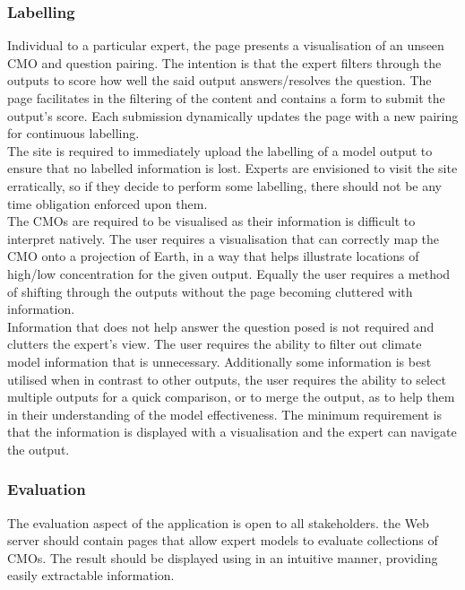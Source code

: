 \documentclass{ecmm427_assignment}
\begin{document}
\subsubsection{Labelling}

\quad Individual to a particular expert, the page presents a visualisation of an unseen CMO and question pairing. The intention is that the expert filters through the outputs to score how well the said output answers/resolves the question. The page facilitates in the filtering of the content and contains a form to submit the output's score. Each submission dynamically updates the page with a new pairing for continuous labelling.\\

\quad The site is required to immediately upload the labelling of a model output to ensure that no labelled information is lost. Experts are envisioned to visit the site erratically, so if they decide to perform some labelling, there should not be any time obligation enforced upon them.\\

\quad The CMOs are required to be visualised as their information is difficult to interpret natively. The user requires a visualisation that can correctly map the CMO onto a projection of Earth, in a way that helps illustrate locations of high/low concentration for the given output. Equally the user requires a method of shifting through the outputs without the page becoming cluttered with information.\\

\quad Information that does not help answer the question posed is not required and clutters the expert's view. The user requires the ability to filter out climate model information that is unnecessary. Additionally some information is best utilised when in contrast to other outputs, the user requires the ability to select multiple outputs for a quick comparison, or to merge the output, as to help them in their understanding of the model effectiveness. The minimum requirement is that the information is displayed with a visualisation and the expert can navigate the output. 

\subsubsection{Evaluation}

\quad The evaluation aspect of the application is open to all stakeholders. the Web server should contain pages that allow expert models to evaluate collections of CMOs. The result should be displayed using in an intuitive manner, providing easily extractable information.\\
\end{document}

